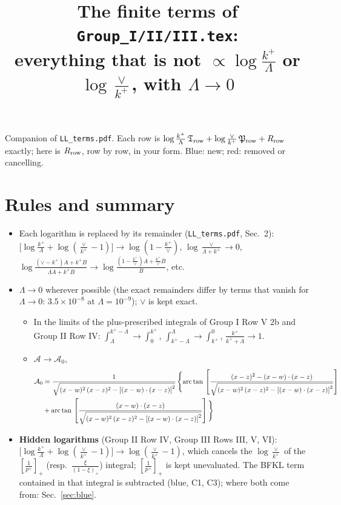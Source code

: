 \documentclass[10pt]{article}
\title{The finite terms of \texttt{Group\_I/II/III.tex}:\\ everything that is not $\propto\log\frac{k^+}{\Lambda}$ or $\log\frac{\vee}{k^+}$, with $\Lambda\to0$}
\date{}
\numberwithin{equation}{section}
\newcommand{\new}[1]{{\color{blue}#1}}
\newcommand{\old}[1]{{\color{red}#1}}
\begin{document}
\maketitle
\noindent Companion of \texttt{LL\_terms.pdf}. Each row is $\log\frac{k^+}{\Lambda}\,\mathfrak T_{\rm row}+\log\frac{\vee}{k^+}\,\mathfrak P_{\rm row}+R_{\rm row}$ exactly; here is $R_{\rm row}$, row by row, in your form. \new{Blue}: new; \old{red}: removed or cancelling.

\section{Rules and summary}\label{sec:rules}
\begin{itemize}
\item Each logarithm is replaced by its remainder (\texttt{LL\_terms.pdf}, Sec.~2): $\big[\log\frac{k^+}{\Lambda}+\log(\frac{\vee}{k^+}-1)\big]\to\log(1-\frac{k^+}{\vee})$, $\log\frac{\vee}{\Lambda+k^+}\to0$, $\log\frac{(\vee-k^+)A+k^+B}{\Lambda A+k^+B}\to\log\frac{(1-\frac{k^+}{\vee})A+\frac{k^+}{\vee}B}{B}$, etc.
\item $\Lambda\to0$ wherever possible (the exact remainders differ by terms that vanish for $\Lambda\to0$: $3.5\times10^{-8}$ at $\Lambda=10^{-9}$); $\vee$ is kept exact.
\begin{itemize}
\item In the limits of the plus-prescribed integrals of Group I Row V 2b and Group II Row IV: $\int_\Lambda^{k^+-\Lambda}\to\int_0^{k^+}$, $\int_{k^+-\Lambda}^{\Lambda}\to\int_{k^+}^0$, $\frac{k^+}{k^++\Lambda}\to1$.
\item $\mathcal A\to\mathcal A_0$,
\begin{align}
\mathcal{A}_{0} & = \frac{1}{\sqrt{(x-w)^{2}\,(x-z)^{2}-\left[(x-w)\cdot (x-z)\right]^{2}}}\, \Bigg\{\mathrm{arc\,tan}\,\left[\frac{(x-z)^{2}-(x-w)\cdot (x-z)}{\sqrt{(x-w)^{2}\,(x-z)^{2}-\left[(x-w)\cdot (x-z)\right]^{2}}}\right]\notag \\ & + \mathrm{arc\,tan}\,\left[\frac{(x-w)\cdot (x-z)}{\sqrt{(x-w)^{2}\,(x-z)^{2}-\left[(x-w)\cdot (x-z)\right]^{2}}}\right] \Bigg\}
\label{eq:A0}
\end{align}
\end{itemize}
\item \textbf{Hidden logarithms} (Group II Row IV, Group III Rows III, V, VI): $\big[\log\frac{k^+}{\Lambda}+\log(\frac{\vee}{k^+}-1)\big]\to\log(\frac{\vee}{k^+}-1)$, which cancels the $\log\frac{\vee}{k^+}$ of the $\left[\frac{1}{p^+}\right]_+$ (resp.\ $\frac{\xi}{(1-\xi)_+}$) integral; $\left[\frac{1}{p^+}\right]_+$ is kept unevaluated. The BFKL term contained in that integral is subtracted (\new{blue}, C1, C3); where both come from: Sec.~\ref{sec:blue}.

\end{itemize}
\end{document}
